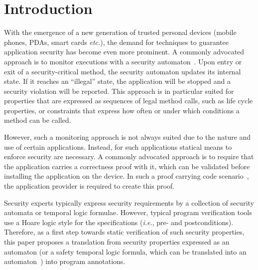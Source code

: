 \section{Introduction}\label{SecIntro}

With the emergence of a new generation of trusted personal devices
(mobile phones, PDAs, smart cards \emph{etc.}), the demand for
techniques to guarantee application security has become even more
prominent. A commonly advocated approach is to monitor
executions with a security automaton~\cite{Schneider99}. Upon entry
or exit of a security-critical method, the security automaton updates
its internal state. If it reaches an ``illegal'' state, the
application will be stopped and a security violation will be
reported. This approach is in particular suited for properties that
are expressed as sequences of legal method calls, such as life cycle
properties, or constraints that express how often or under which
conditions a method can be called.

However, such a monitoring approach is not always suited due to the
nature and use of certain applications.
Instead, for such applications
statical means to enforce security are necessary. A commonly advocated
approach is to require that the application carries a correctness
proof with it, which can be validated before installing the application
on the device. In such a proof carrying code scenario~\cite{Necula97},
the application provider is required to create this proof.

Security experts typically express security requirements by a collection of
security automata or temporal logic formulae. However, typical program
verification tools use a Hoare logic style for the specifications
(\emph{i.e.}, pre- and postconditions).
Therefore, as a first step towards static
verification of such security properties, this paper proposes a
translation from security properties expressed as an automaton (or a
safety temporal logic formula, which can be translated into an
automaton~\cite{Wolper01}) into program annotations.

